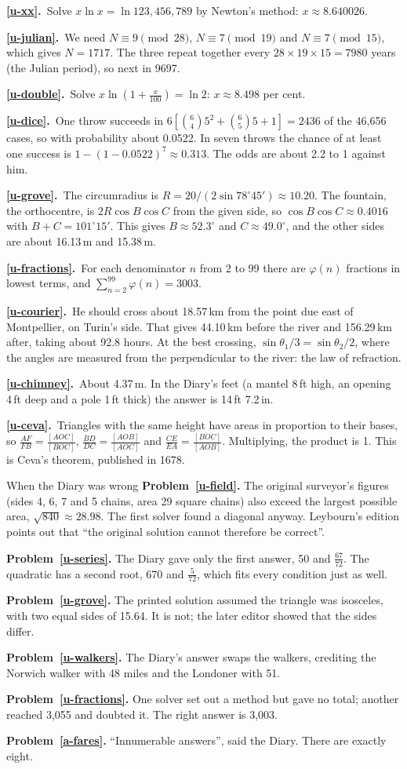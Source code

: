 \documentclass[11pt,a4paper]{article}
\newcounter{prob}
\newcommand{\ans}[2]{\par\smallskip\noindent\textbf{\ref{#1}.}\ #2}
\begin{document}
\ans{u-xx}{Solve $x\ln x = \ln123{,}456{,}789$ by Newton's method: $x \approx 8.640026$.}
\ans{u-julian}{We need $N \equiv 9 \pmod{28}$, $N \equiv 7 \pmod{19}$ and $N \equiv 7
\pmod{15}$, which gives $N = 1717$. The three repeat together every $28\times19\times15 =
7980$ years (the Julian period), so next in 9697.}
\ans{u-double}{Solve $x\ln\!\left(1+\tfrac{x}{100}\right) = \ln2$: $x \approx 8.498$ per
cent.}
\ans{u-dice}{One throw succeeds in $6\left[\binom64 5^2+\binom65 5+1\right] = 2436$ of
the 46,656 cases, so with probability about 0.0522. In seven throws the chance of at
least one success is $1-(1-0.0522)^7 \approx 0.313$. The odds are about 2.2 to 1 against
him.}
\ans{u-grove}{The circumradius is $R = 20/(2\sin78^\circ45') \approx 10.20$. The
fountain, the orthocentre, is $2R\cos B\cos C$ from the given side, so
$\cos B\cos C \approx 0.4016$ with $B + C = 101^\circ15'$. This gives $B \approx 52.3^\circ$
and $C \approx 49.0^\circ$, and the other sides are about 16.13\,m and 15.38\,m.}
\ans{u-fractions}{For each denominator $n$ from 2 to 99 there are $\varphi(n)$ fractions in
lowest terms, and $\sum_{n=2}^{99}\varphi(n) = 3003$.}
\ans{u-courier}{He should cross about 18.57\,km from the point due east of Montpellier,
on Turin's side. That gives 44.10\,km before the river and 156.29\,km after, taking about
92.8 hours. At the best crossing, $\sin\theta_1/3 = \sin\theta_2/2$, where the angles are
measured from the perpendicular to the river: the law of refraction.}
\ans{u-chimney}{About 4.37\,m. In the Diary's feet (a mantel 8\,ft high, an opening 4\,ft
deep and a pole 1\,ft thick) the answer is 14\,ft 7.2\,in.}
\ans{u-ceva}{Triangles with the same height have areas in proportion to their bases, so
$\tfrac{AF}{FB} = \tfrac{[AOC]}{[BOC]}$, $\tfrac{BD}{DC} = \tfrac{[AOB]}{[AOC]}$ and
$\tfrac{CE}{EA} = \tfrac{[BOC]}{[AOB]}$. Multiplying, the product is 1. This is Ceva's
theorem, published in 1678.}

\begin{diarynote}{When the Diary was wrong}
\textbf{Problem~\ref{u-field}.} The original surveyor's figures (sides 4, 6, 7 and 5
chains, area 29 square chains) also exceed the largest possible area, $\sqrt{840}\approx
28.98$. The first solver found a diagonal anyway. Leybourn's edition points out that
``the original solution cannot therefore be correct''.

\textbf{Problem~\ref{u-series}.} The Diary gave only the first answer, 50 and
$\tfrac{67}{72}$. The quadratic has a second root, 670 and $\tfrac5{72}$, which fits every
condition just as well.

\textbf{Problem~\ref{u-grove}.} The printed solution assumed the triangle was isosceles,
with two equal sides of 15.64. It is not; the later editor showed that the sides differ.

\textbf{Problem~\ref{u-walkers}.} The Diary's answer swaps the walkers, crediting the
Norwich walker with 48 miles and the Londoner with 51.

\textbf{Problem~\ref{u-fractions}.} One solver set out a method but gave no total;
another reached 3,055 and doubted it. The right answer is 3,003.

\textbf{Problem~\ref{a-fares}.} ``Innumerable answers'', said the Diary. There are
exactly eight.
\end{diarynote}
\end{document}

